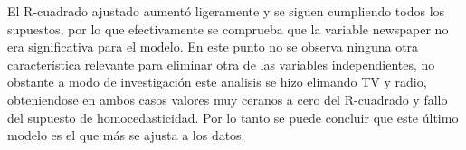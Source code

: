 \documentclass[12pt,a4paper]{article}
\begin{document}
	El R-cuadrado ajustado aumentó ligeramente y se siguen cumpliendo todos los supuestos, por lo que efectivamente se comprueba que la variable newspaper no era significativa para el modelo. En este punto no se observa ninguna otra característica relevante para eliminar otra de las variables independientes, no obstante a modo de investigación este analisis se hizo elimando TV y radio, obteniendose en ambos casos valores muy ceranos a cero del R-cuadrado y fallo del supuesto de homocedasticidad. Por lo tanto se puede concluir que este último modelo es el que más se ajusta a los datos.\\
	
	
	
		
\end{document}
